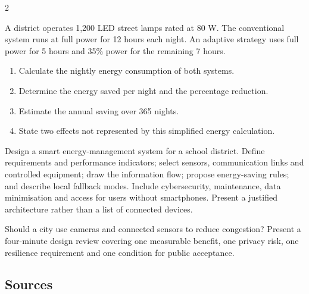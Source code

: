 \begin{multicols}{2}
\begin{applicationexercise}
A district operates 1,200 LED street lamps rated at 80 W. The conventional system runs at full power
for 12 hours each night. An adaptive strategy uses full power for 5 hours and 35\% power for the
remaining 7 hours.
\begin{enumerate}
\item Calculate the nightly energy consumption of both systems.
\item Determine the energy saved per night and the percentage reduction.
\item Estimate the annual saving over 365 nights.
\item State two effects not represented by this simplified energy calculation.
\end{enumerate}
\end{applicationexercise}

\begin{engineeringchallenge}
Design a smart energy-management system for a school district. Define requirements and performance
indicators; select sensors, communication links and controlled equipment; draw the information flow;
propose energy-saving rules; and describe local fallback modes. Include cybersecurity, maintenance,
data minimisation and access for users without smartphones. Present a justified architecture rather
than a list of connected devices.
\end{engineeringchallenge}

\begin{speaking}
Should a city use cameras and connected sensors to reduce congestion? Present a four-minute design
review covering one measurable benefit, one privacy risk, one resilience requirement and one
condition for public acceptance.
\end{speaking}
\end{multicols}

\subsection*{Sources}
